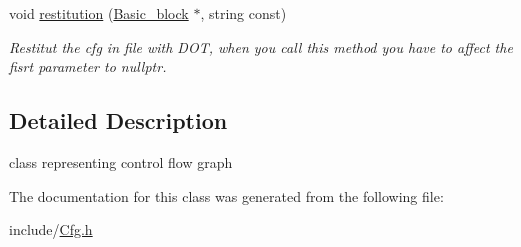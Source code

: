 \begin{DoxyCompactItemize}
\mbox{\label{class_cfg_a668d40acb10bfad95cf0d664e1522a7a}} 
void \mbox{\hyperlink{class_cfg_a668d40acb10bfad95cf0d664e1522a7a}{restitution}} (\mbox{\hyperlink{class_basic__block}{Basic\+\_\+block}} $\ast$, string const)
\begin{DoxyCompactList}\small\item\em Restitut the cfg in file with D\+OT, when you call this method you have to affect the fisrt parameter to nullptr. \end{DoxyCompactList}\end{DoxyCompactItemize}


\subsection{Detailed Description}
class representing control flow graph 

The documentation for this class was generated from the following file\+:\begin{DoxyCompactItemize}
\item 
include/\mbox{\hyperlink{_cfg_8h}{Cfg.\+h}}\end{DoxyCompactItemize}
